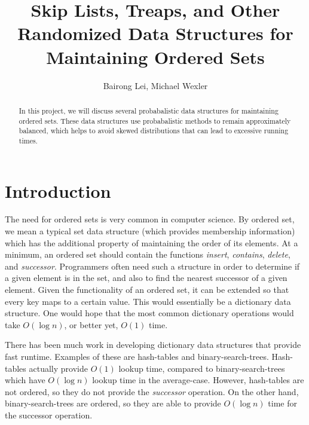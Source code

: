 \documentclass[oribibl]{llncs}
\begin{document}
\title{ Skip Lists, Treaps, and Other Randomized Data Structures for Maintaining Ordered Sets}

\author{Bairong Lei, Michael Wexler}


\maketitle

\begin{abstract}
  In this project, we will discuss several probabalistic data structures for maintaining ordered sets. These
  data structures use probabalistic methods to remain approximately balanced, which helps to avoid skewed distributions that can lead to excessive running times. 
\end{abstract}


\section{Introduction}

The need for ordered sets is very common in computer science. By ordered set, we mean a typical set data structure (which provides membership information) which has the additional property of maintaining the order of its elements. At a minimum, an ordered set should contain the functions {\it insert}, {\it contains}, {\it delete}, and {\it successor}. Programmers often need such a structure in order to determine if a given element is in the set, and also to find the nearest successor of a given element. Given the functionality of an ordered set, it can be extended so that every key maps to a certain value. This would essentially be a dictionary data structure. One would hope that the most common dictionary operations would take $O(\log{n})$, or better yet, $O(1)$ time.

There has been much work in developing dictionary data structures that provide fast runtime. Examples of these are hash-tables and binary-search-trees. Hash-tables actually provide $O(1)$ lookup time, compared to binary-search-trees which have $O(\log{n})$ lookup time in the average-case. However, hash-tables are not ordered, so they do not provide the {\it successor} operation. On the other hand, binary-search-trees are ordered, so they are able to provide $O(\log{n})$ time for the successor operation.
 
\end{document}
